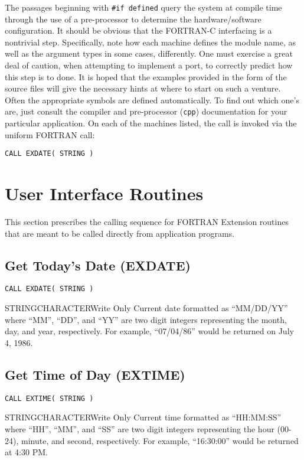 The passages beginning with \verb+#if defined+ query the
system at compile time through the use of a pre-processor
to determine the hardware/software configuration.
It should be obvious that the FORTRAN-C interfacing is
a nontrivial step.
Specifically,
note how each machine defines the module name,
as well as the argument types in some cases,
differently.
One must exercise a great deal of caution, when attempting
to implement a port, to correctly predict how this step is to done.
It is hoped that the examples provided in the form of the source
files will give the necessary hints at where to start on such a
venture.
Often the appropriate symbols are defined automatically.
To find out which one's are, just consult the compiler
and pre-processor (\verb+cpp+) documentation
for your particular application.
On each of the machines listed,
the call is invoked via the uniform FORTRAN call:
\begin{verbatim}
CALL EXDATE( STRING )
\end{verbatim}

\section{User Interface Routines}
This section prescribes the calling sequence for FORTRAN Extension routines
that are meant to be called directly from application programs.

\subsection{Get Today's Date (EXDATE)}

\verb+CALL EXDATE( STRING )+

\begin{argy}{STRING}{CHARACTER}{Write Only}
Current date formatted as ``MM/DD/YY'' where ``MM'', ``DD'', and ``YY'' are
two digit integers representing the month, day, and year, respectively.  For
example, ``07/04/86'' would be returned on July 4, 1986.
\end{argy}

\subsection{Get Time of Day (EXTIME)}

\verb+CALL EXTIME( STRING )+

\begin{argy}{STRING}{CHARACTER}{Write Only}
Current time formatted as ``HH:MM:SS'' where ``HH'', ``MM'', and ``SS'' are
two digit integers representing the hour (00-24), minute, and second,
respectively.  For example, ``16:30:00'' would be returned at 4:30 PM.
\end{argy}

